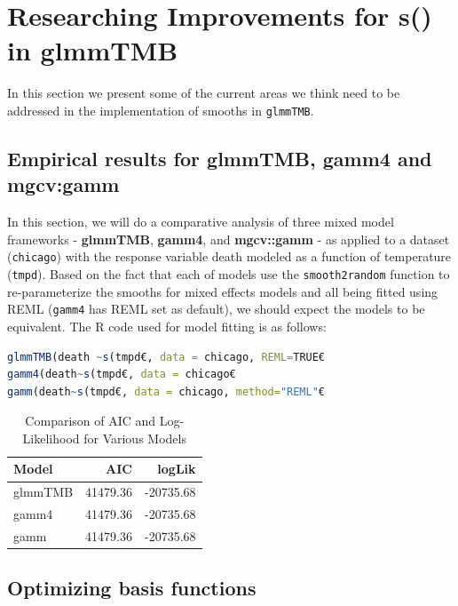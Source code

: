 \documentclass[12pt, twoside,hidelinks]{article}
\theoremstyle{definition}
\numberwithin{equation}{section}
\begin{document}
\section{Researching Improvements for \textbf{s()} in \textbf{glmmTMB}}\label{sec:research}

In this section we present some of the current areas we think need to be addressed in the implementation of smooths in \texttt{glmmTMB}. 

\subsection{Empirical results for \textbf{glmmTMB}, \textbf{gamm4} and \textbf{mgcv:gamm}}\label{sec:research:empiric}

In this section, we will do a comparative analysis of three mixed model frameworks - \textbf{glmmTMB}, \textbf{gamm4}, and \textbf{mgcv::gamm} - as applied to a dataset (\texttt{chicago}) with the response variable death modeled as a function of temperature (\texttt{tmpd}). Based on the fact that each of models use the \texttt{smooth2random} function to re-parameterize the smooths for mixed effects models and all being fitted using REML (\texttt{gamm4} has REML set as default), we should expect the models to be equivalent. The R code used for model fitting is as follows:

\begin{lstlisting}[language=R]
glmmTMB(death ~s(tmpd€, data = chicago, REML=TRUE€
gamm4(death~s(tmpd€, data = chicago€
gamm(death~s(tmpd€, data = chicago, method="REML"€
\end{lstlisting}


\begin{table}[H]
\centering
\caption{Comparison of AIC and Log-Likelihood for Various Models}
\label{tab:model_comparison}
\begin{tabular}{lrr}
\hline
Model & AIC & logLik \\ 
\hline
glmmTMB & 41479.36 & -20735.68 \\
gamm4 & 41479.36 & -20735.68 \\
gamm & 41479.36 & -20735.68 \\
\hline
\end{tabular}
\end{table}

\subsection{Optimizing basis functions}\label{sec:research:optimizing}
\end{document}
